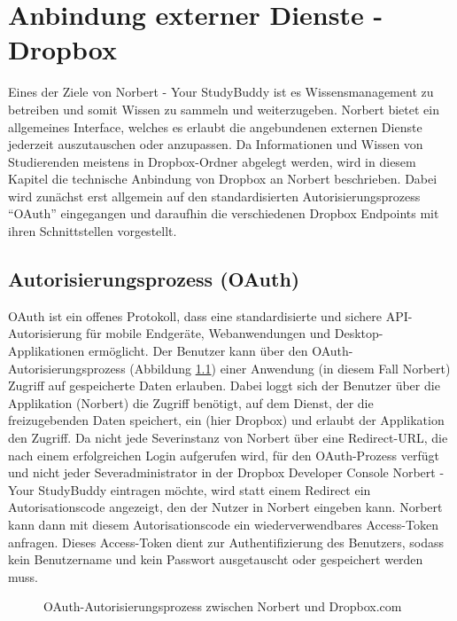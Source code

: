 

\chapter{Anbindung externer Dienste - Dropbox}

Eines der Ziele von Norbert - Your StudyBuddy ist es Wissensmanagement zu betreiben und somit Wissen zu sammeln und weiterzugeben. Norbert bietet ein allgemeines Interface, welches es erlaubt die angebundenen externen Dienste jederzeit auszutauschen oder anzupassen.
Da Informationen und Wissen von Studierenden meistens in Dropbox-Ordner abgelegt werden, wird in diesem Kapitel die technische Anbindung von Dropbox an Norbert beschrieben. Dabei wird zunächst erst allgemein auf den standardisierten Autorisierungsprozess \enquote{OAuth} eingegangen und daraufhin die verschiedenen Dropbox Endpoints mit ihren Schnittstellen vorgestellt.


\section{Autorisierungsprozess (OAuth)}

OAuth ist ein offenes Protokoll, dass eine standardisierte und sichere API-Autorisierung für mobile Endgeräte, Webanwendungen und Desktop-Applikationen ermöglicht. Der Benutzer kann über den OAuth-Autorisierungsprozess (Abbildung \ref{04ergebnis:oauth}) einer Anwendung (in diesem Fall Norbert) Zugriff auf gespeicherte Daten erlauben. Dabei loggt sich der Benutzer über die Applikation (Norbert) die Zugriff benötigt, auf dem Dienst, der die freizugebenden Daten speichert, ein (hier Dropbox) und erlaubt der Applikation den Zugriff. Da nicht jede Severinstanz von Norbert über eine Redirect-URL, die nach einem erfolgreichen Login aufgerufen wird, für den OAuth-Prozess verfügt und nicht jeder Severadministrator in der Dropbox Developer Console Norbert - Your StudyBuddy eintragen möchte, wird statt einem Redirect ein Autorisationscode angezeigt, den der Nutzer in Norbert eingeben kann. Norbert kann dann mit diesem Autorisationscode ein wiederverwendbares Access-Token anfragen. Dieses Access-Token dient zur Authentifizierung des Benutzers, sodass kein Benutzername und kein Passwort ausgetauscht oder gespeichert werden muss.

\begin{figure}[H]
\centering
	\scalebox{0.5}{}
	\caption{OAuth-Autorisierungsprozess zwischen Norbert und Dropbox.com}
	\label{04ergebnis:oauth}	
\end{figure}


